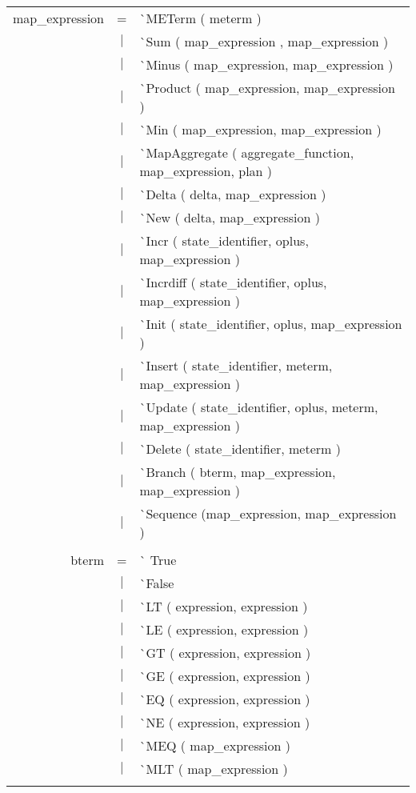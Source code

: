 \documentclass{article}
\begin{document}
\begin{tabular}[ht] {rcl}
map\_expression &=& \`{}METerm ( meterm ) \\
&$\lvert$ & \`{}Sum ( map\_expression , map\_expression )\\
&$\lvert$ & \`{}Minus ( map\_expression,  map\_expression )\\
&$\lvert$ & \`{}Product ( map\_expression, map\_expression )\\
&$\lvert$ & \`{}Min ( map\_expression, map\_expression )\\
&$\lvert$ & \`{}MapAggregate ( aggregate\_function, map\_expression, plan )\\
&$\lvert$ & \`{}Delta ( delta,  map\_expression )\\
&$\lvert$ & \`{}New ( delta, map\_expression )\\
&$\lvert$ & \`{}Incr ( state\_identifier, oplus, map\_expression )\\
&$\lvert$ & \`{}Incrdiff ( state\_identifier, oplus, map\_expression )\\
&$\lvert$ & \`{}Init ( state\_identifier, oplus, map\_expression )\\
&$\lvert$ & \`{}Insert ( state\_identifier, meterm, map\_expression )\\
&$\lvert$ & \`{}Update ( state\_identifier, oplus, meterm, map\_expression )\\
&$\lvert$ & \`{}Delete ( state\_identifier, meterm )\\
&$\lvert$ & \`{}Branch ( bterm, map\_expression, map\_expression ) \\
&$\lvert$ & \`{}Sequence (map\_expression, map\_expression ) \\
\\
bterm &=& \`{} True \\
&$\lvert$ & \`{}False \\
&$\lvert$ & \`{}LT ( expression,  expression )\\
&$\lvert$ & \`{}LE ( expression, expression )\\
&$\lvert$ & \`{}GT ( expression, expression )\\
&$\lvert$ & \`{}GE ( expression, expression )\\
&$\lvert$ & \`{}EQ ( expression, expression )\\
&$\lvert$ & \`{}NE ( expression, expression )\\
&$\lvert$ & \`{}MEQ ( map\_expression )\\
&$\lvert$ & \`{}MLT ( map\_expression )\\
\\

\end{tabular}
\end{document}
